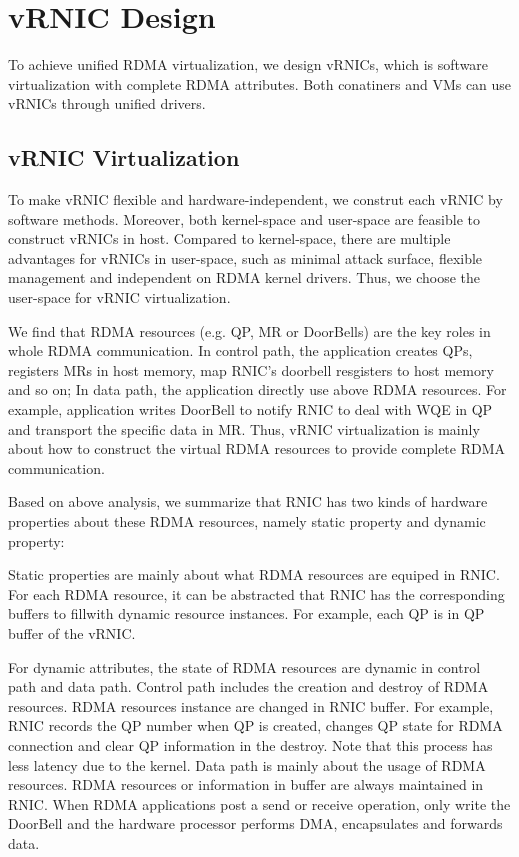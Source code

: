 \section{vRNIC Design}
To achieve unified RDMA virtualization, we design vRNICs, which is software virtualization with complete RDMA attributes. Both conatiners and VMs can use vRNICs through unified drivers. 

\subsection{vRNIC Virtualization}

To make vRNIC flexible and hardware-independent, we construt each vRNIC by software methods. Moreover, both kernel-space and user-space are feasible to construct vRNICs in host. Compared to kernel-space, there are multiple advantages for vRNICs in user-space, such as minimal attack surface, flexible management and independent on RDMA kernel drivers. Thus, we choose the user-space for vRNIC virtualization.

We find that RDMA resources (e.g. QP, MR or DoorBells) are the key roles in whole RDMA communication. In control path, the application creates QPs, registers MRs in host memory, map RNIC's doorbell resgisters to host memory and so on; In data path, the application directly use above RDMA resources. For example, application writes DoorBell to notify RNIC to deal with WQE in QP and transport the specific data in MR. Thus, vRNIC virtualization is mainly about how to construct the virtual RDMA resources to provide complete RDMA communication. 

Based on above analysis, we summarize that RNIC has two kinds of hardware properties about these RDMA resources, namely static property and dynamic property:

Static properties are mainly about what RDMA resources are equiped in RNIC. For each RDMA resource, it can be abstracted that RNIC has the corresponding buffers to fillwith dynamic resource instances. For example, each QP is in QP buffer of the vRNIC.

For dynamic attributes, the state of RDMA resources are dynamic in control path and data path. Control path includes the creation and destroy of RDMA resources. RDMA resources instance are changed in RNIC buffer. For example, RNIC records the QP number when QP is created, changes QP state for RDMA connection and clear QP information in the destroy. Note that this process has less latency due to the kernel. Data path is mainly about the usage of RDMA resources. RDMA resources or information in buffer are always maintained in RNIC. When RDMA applications post a send or receive operation, only write the DoorBell and the hardware processor performs DMA, encapsulates and forwards data.

